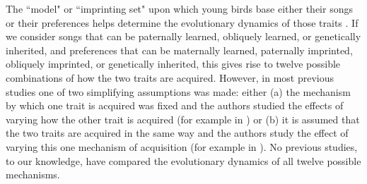 \documentclass[12pt]{article}
\begin{document}
The ``model" or ``imprinting set" upon which young birds base either their songs or their preferences helps determine the evolutionary dynamics of those traits \cite{Tramm:2008ij}. If we consider songs that can be paternally learned, obliquely learned, or genetically inherited, and preferences that can be maternally learned, paternally imprinted, obliquely imprinted, or genetically inherited, this gives rise to twelve possible combinations of how the two traits are acquired. However, in most previous studies one of two simplifying assumptions was made:  either (a) the mechanism by which one trait is acquired was fixed and the authors studied the effects of varying how the other trait is acquired (for example in \cite{Gilman:2015fk,Verzijden:2005vn,Kirkpatrick:1994vn,Lachlan:2004tg}) or (b) it is assumed that the two traits are acquired in the same way and the authors study the effect of varying this one mechanism of acquisition (for example in \cite{Yeh:2015bh}). 
No previous studies, to our knowledge, have compared the evolutionary dynamics of all twelve possible mechanisms.
\end{document}
